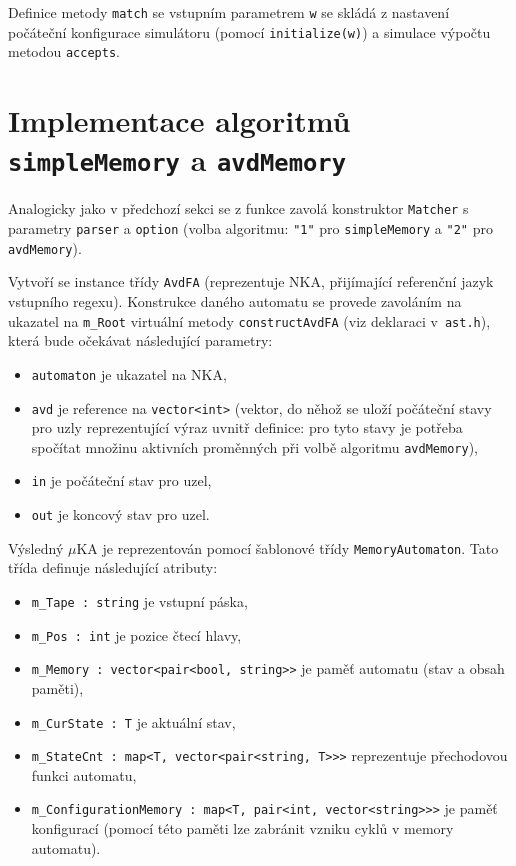\documentclass[thesis=B,czech]{FITthesis}[2019/12/23]
\theoremstyle{definition}
\begin{document}
Definice metody \texttt{match} se vstupním parametrem \texttt{w} se skládá z nastavení počáteční konfigurace simulátoru (pomocí \texttt{initialize(w)}) a simulace výpočtu  metodou \texttt{accepts}.
\section{Implementace algoritmů \texttt{simpleMemory} a \texttt{avdMemory}}\label{sec:implAvd}
Analogicky jako v předchozí sekci se z funkce  zavolá konstruktor \texttt{Matcher} s parametry \texttt{parser} a \texttt{option} (volba algoritmu: \texttt{"1"} pro \texttt{simpleMemory} a \texttt{"2"} pro \texttt{avdMemory}). 

Vytvoří se instance třídy \texttt{AvdFA} (reprezentuje NKA, přijímající referenční jazyk vstupního regexu). Konstrukce daného automatu se provede zavoláním na ukazatel na \texttt{m\_Root} virtuální metody \texttt{constructAvdFA} (viz deklaraci v~\texttt{ast.h}), která bude očekávat následující parametry:
\begin{itemize}
	\item{\texttt{automaton} je ukazatel na NKA,}
	\item{\texttt{avd} je reference na \texttt{vector<int>} (vektor, do něhož se uloží počáteční stavy pro uzly reprezentující výraz uvnitř definice: pro tyto stavy je potřeba spočítat množinu aktivních proměnných při volbě algoritmu \texttt{avdMemory}),}
	\item{\texttt{in} je počáteční stav pro uzel,}
	\item{\texttt{out} je koncový stav pro uzel.}	
\end{itemize} 

Výsledný $\mu$KA je reprezentován pomocí šablonové třídy \texttt{MemoryAutomaton}. Tato třída definuje následující atributy: 
\begin{itemize} 
	\item{\texttt{m\_Tape : string} je vstupní páska,}
	\item{\texttt{m\_Pos : int} je pozice čtecí hlavy,}
	\item{\texttt{m\_Memory : vector<pair<bool, string>>} je paměť automatu (stav a obsah paměti),}
	\item{\texttt{m\_CurState : T} je aktuální stav,}
	\item{\texttt{m\_StateCnt :  map<T, vector<pair<string, T>>>} reprezentuje přechodovou funkci automatu,}
	\item{\texttt{m\_ConfigurationMemory : map<T, pair<int, vector<string>>>} je paměť konfigurací (pomocí této paměti lze zabránit vzniku cyklů v memory automatu).}
\end{itemize}
\end{document}
